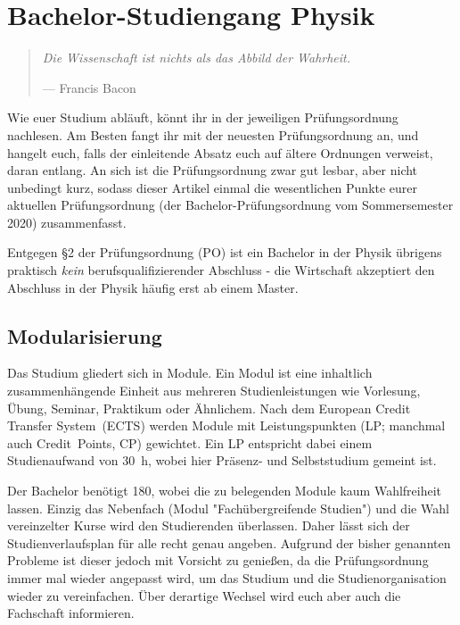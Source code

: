 \section[Bachelor-Studiengang Physik]{Bachelor-Studiengang Physik}
\begin{multicols}{2}
\begin{quote}
	\textit{Die Wissenschaft ist nichts als das Abbild der Wahrheit.}
	
	\hfill--- Francis Bacon
\end{quote}

Wie euer Studium abläuft, könnt ihr in der jeweiligen Prüfungsordnung nachlesen. Am Besten fangt ihr mit der neuesten Prüfungsordnung an, und hangelt euch, falls der einleitende Absatz euch auf ältere Ordnungen verweist, daran entlang. An sich ist die Prüfungsordnung zwar gut lesbar, aber nicht unbedingt kurz, sodass dieser Artikel einmal die wesentlichen Punkte eurer aktuellen Prüfungsordnung (der Bachelor-Prüfungsordnung vom Sommersemester 2020) zusammenfasst.

Entgegen §2 der Prüfungsordnung (PO) ist ein Bachelor in der Physik übrigens praktisch \emph{kein} berufsqualifizierender Abschluss - die Wirtschaft akzeptiert den Abschluss in der Physik häufig erst ab einem Master.

\subsection{Modularisierung}
Das Studium gliedert sich in Module.
Ein Modul ist eine inhaltlich zusammenhängende Einheit aus mehreren Studienleistungen wie Vorlesung, Übung, Seminar, Praktikum oder Ähnlichem.
Nach dem European Credit Transfer System~(ECTS) werden Module mit Leistungspunkten (LP; manchmal auch Credit~Points, CP) gewichtet.
Ein LP entspricht dabei einem Studienaufwand von \SI{30}{\hour}, wobei hier Präsenz- und Selbststudium gemeint ist.

Der Bachelor benötigt \SI{180}{\LP}, wobei die zu belegenden Module kaum Wahlfreiheit lassen.
Einzig das Nebenfach (Modul "Fachübergreifende Studien") und die Wahl vereinzelter Kurse wird den Studierenden überlassen.
Daher lässt sich der Studienverlaufsplan für alle recht genau angeben.
Aufgrund der bisher genannten Probleme ist dieser jedoch mit Vorsicht zu genießen, da die Prüfungsordnung immer mal wieder angepasst wird, um das Studium und die Studienorganisation wieder zu vereinfachen.
Über derartige Wechsel wird euch aber auch die Fachschaft informieren.\\
\\


\end{multicols}
